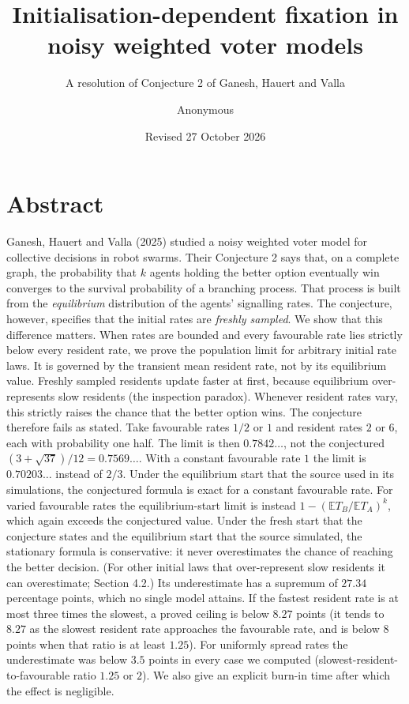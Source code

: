 \documentclass[
  british,
  11pt,
  a4paper,
]{article}
\title{Initialisation-dependent fixation in noisy weighted voter models}
\subtitle{A resolution of Conjecture 2 of Ganesh, Hauert and Valla}
\author{Anonymous}
\date{Revised 27 October 2026}
\begin{document}
\maketitle

\section{Abstract}\label{abstract}

Ganesh, Hauert and Valla (2025) studied a noisy weighted voter model for
collective decisions in robot swarms. Their Conjecture 2 says that, on a
complete graph, the probability that \(k\) agents holding the better
option eventually win converges to the survival probability of a
branching process. That process is built from the \emph{equilibrium}
distribution of the agents' signalling rates. The conjecture, however,
specifies that the initial rates are \emph{freshly sampled}. We show
that this difference matters. When rates are bounded and every
favourable rate lies strictly below every resident rate, we prove the
population limit for arbitrary initial rate laws. It is governed by the
transient mean resident rate, not by its equilibrium value. Freshly
sampled residents update faster at first, because equilibrium
over-represents slow residents (the inspection paradox). Whenever
resident rates vary, this strictly raises the chance that the better
option wins. The conjecture therefore fails as stated. Take favourable
rates \(1/2\) or \(1\) and resident rates \(2\) or \(6\), each with
probability one half. The limit is then \(0.7842\ldots\), not the
conjectured \((3+\sqrt{37})/12=0.7569\ldots\). With a constant
favourable rate \(1\) the limit is \(0.70203\ldots\) instead of \(2/3\).
Under the equilibrium start that the source used in its simulations, the
conjectured formula is exact for a constant favourable rate. For varied
favourable rates the equilibrium-start limit is instead
\(1-(\mathbb E T_B/\mathbb E T_A)^k\), which again exceeds the
conjectured value. Under the fresh start that the conjecture states and
the equilibrium start that the source simulated, the stationary formula
is conservative: it never overestimates the chance of reaching the
better decision. (For other initial laws that over-represent slow
residents it can overestimate; Section 4.2.) Its underestimate has a
supremum of \(27.34\) percentage points, which no single model attains.
If the fastest resident rate is at most three times the slowest, a
proved ceiling is below \(8.27\) points (it tends to \(8.27\) as the
slowest resident rate approaches the favourable rate, and is below \(8\)
points when that ratio is at least \(1.25\)). For uniformly spread rates
the underestimate was below \(3.5\) points in every case we computed
(slowest-resident-to-favourable ratio \(1.25\) or \(2\)). We also give
an explicit burn-in time after which the effect is negligible.
\end{document}
